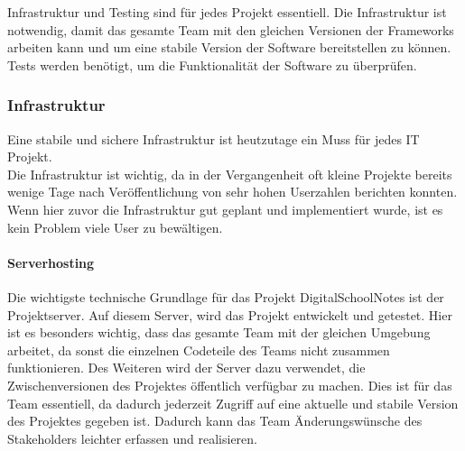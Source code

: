 
Infrastruktur und Testing sind für jedes Projekt essentiell. Die Infrastruktur ist notwendig, damit das gesamte Team mit den gleichen Versionen der Frameworks arbeiten kann und um eine stabile Version der Software bereitstellen zu können. Tests werden benötigt, um die Funktionalität der Software zu überprüfen.
\subsubsection{Infrastruktur}
Eine stabile und sichere Infrastruktur ist heutzutage ein Muss für jedes IT Projekt. \\
Die Infrastruktur ist wichtig, da in der Vergangenheit oft kleine Projekte bereits wenige Tage nach Veröffentlichung von sehr hohen Userzahlen berichten konnten. Wenn hier zuvor die Infrastruktur gut geplant und implementiert wurde, ist es kein Problem viele User zu bewältigen.
\paragraph{Serverhosting}
Die wichtigste technische Grundlage für das Projekt DigitalSchoolNotes ist der Projektserver. Auf diesem Server, wird das Projekt entwickelt und getestet. Hier ist es besonders wichtig, dass das gesamte Team mit der gleichen Umgebung arbeitet, da sonst die einzelnen Codeteile des Teams nicht zusammen funktionieren. Des Weiteren wird der Server dazu verwendet, die Zwischenversionen des Projektes öffentlich verfügbar zu machen. Dies ist für das Team essentiell, da dadurch jederzeit Zugriff auf eine aktuelle und stabile Version des Projektes gegeben ist. Dadurch kann das Team Änderungswünsche des Stakeholders leichter erfassen und realisieren.\\

\newpage

